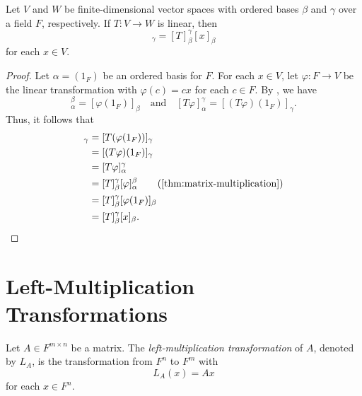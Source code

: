 \begin{corollary}
  Let $V$ and $W$ be finite-dimensional vector spaces with ordered bases
  $\beta$ and $\gamma$ over a field $F$, respectively.
  If $T: V \to W$ is linear, then
  \begin{equation*}
    [T(x)]_\gamma = [T]_\beta^\gamma[x]_\beta
  \end{equation*}
  for each $x \in V$.
\end{corollary}
\begin{proof}
  Let $\alpha = (1_F)$ be an ordered basis for $F$.
  For each $x \in V$, let $\varphi: F \to V$ be the linear transformation with
  $\varphi(c) = cx$ for each $c \in F$.
  By , we have
  \begin{equation*}
    [\varphi]_\alpha^\beta = [\varphi(1_F)]_\beta
    \quad \text{and} \quad
    [T\varphi]_\alpha^\gamma = [(T\varphi)(1_F)]_\gamma.
  \end{equation*}
  Thus, it follows that
  \begin{align*}
    [T(x)]_\gamma
    &= [T(\varphi(1_F))]_\gamma \\
    &= [(T\varphi)(1_F)]_\gamma \\
    &= [T\varphi]_\alpha^\gamma \\
    &= [T]_\beta^\gamma[\varphi]_\alpha^\beta
       \tag{\Cref{thm:matrix-multiplication}} \\
    &= [T]_\beta^\gamma[\varphi(1_F)]_\beta \\
    &= [T]_\beta^\gamma[x]_\beta.
    \qedhere
  \end{align*}
\end{proof}

\section{Left-Multiplication Transformations}
\begin{definition}
  Let $A \in F^{m \times n}$ be a matrix.
  The \emph{left-multiplication transformation} of $A$, denoted by $L_A$,
  is the transformation from $F^n$ to $F^m$ with
  \begin{equation*}
    L_A(x) = Ax
  \end{equation*}
  for each $x \in F^n$.
\end{definition}


